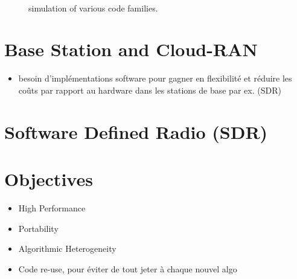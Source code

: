 \begin{figure}[htp]
  \centering
    \quad{}
     \quad{}
    \\
      \quad{}
   \quad{}
  \caption{\AFFECT simulation of various code families.}
  \label{fig:intro_bfer}
\end{figure}

\section{Base Station and Cloud-RAN}

\begin{itemize}
  \item besoin d'implémentations software pour gagner en flexibilité et réduire
    les coûts par rapport au hardware dans les stations de base par ex. (SDR)
\end{itemize}

\section{Software Defined Radio (SDR)}

\section{Objectives}

\begin{itemize}
  \item High Performance
  \item Portability
  \item Algorithmic Heterogeneity
  \item Code re-use, pour éviter de tout jeter à chaque nouvel algo
\end{itemize}
